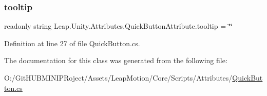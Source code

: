 \subsubsection{\texorpdfstring{tooltip}{tooltip}}
{\footnotesize\ttfamily readonly string Leap.\+Unity.\+Attributes.\+Quick\+Button\+Attribute.\+tooltip = \char`\"{}\char`\"{}}



Definition at line 27 of file Quick\+Button.\+cs.



The documentation for this class was generated from the following file\+:\begin{DoxyCompactItemize}
\item 
O\+:/\+Git\+H\+U\+B\+M\+I\+N\+I\+P\+Roject/\+Assets/\+Leap\+Motion/\+Core/\+Scripts/\+Attributes/\mbox{\hyperlink{_quick_button_8cs}{Quick\+Button.\+cs}}\end{DoxyCompactItemize}
